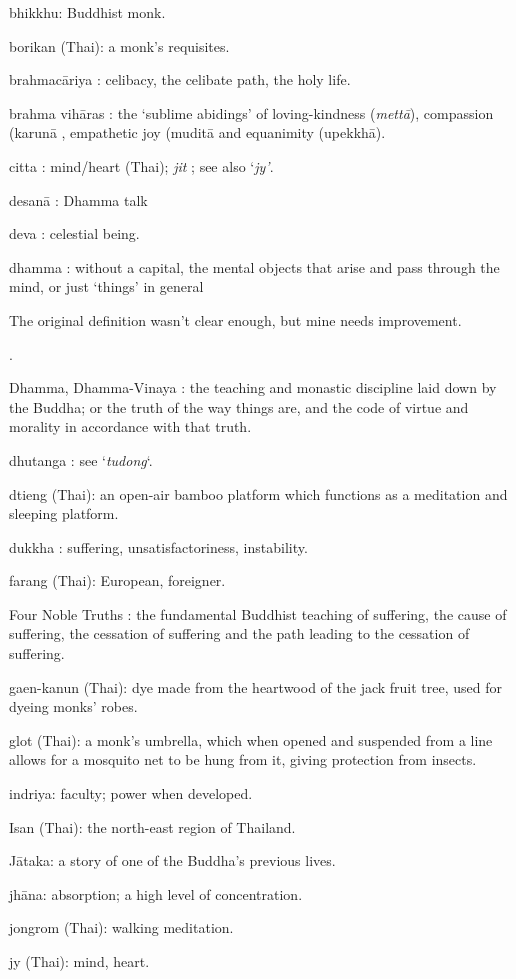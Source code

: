 bhikkhu: Buddhist monk.

borikan (Thai): a monk's requisites.

brahmacāriya : celibacy, the celibate path, the holy life.

brahma vihāras : the `sublime abidings' of loving-kindness
(\emph{mettā}), compassion (karunā , empathetic joy (muditā and
equanimity (upekkhā).

citta : mind/heart (Thai); \emph{jit} ; see also `\emph{jy'}.

desanā : Dhamma talk

deva : celestial being.

dhamma : without a capital, the mental objects that arise and pass
through the mind, or just `things' in general

The original definition wasn't clear enough, but mine needs improvement.

.

Dhamma, Dhamma-Vinaya : the teaching and monastic discipline laid down
by the Buddha; or the truth of the way things are, and the code of
virtue and morality in accordance with that truth.

dhutanga : see `\emph{tudong}`.

dtieng (Thai): an open-air bamboo platform which functions as a
meditation and sleeping platform.

dukkha : suffering, unsatisfactoriness, instability.

farang (Thai): European, foreigner.

Four Noble Truths : the fundamental Buddhist teaching of suffering, the
cause of suffering, the cessation of suffering and the path leading to
the cessation of suffering.

gaen-kanun (Thai): dye made from the heartwood of the jack fruit tree,
used for dyeing monks' robes.

glot (Thai): a monk's umbrella, which when opened and suspended from a
line allows for a mosquito net to be hung from it, giving protection
from insects.

indriya: faculty; power when developed.

Isan (Thai): the north-east region of Thailand.

Jātaka: a story of one of the Buddha's previous lives.

jhāna: absorption; a high level of concentration.

jongrom (Thai): walking meditation.

jy (Thai): mind, heart.

